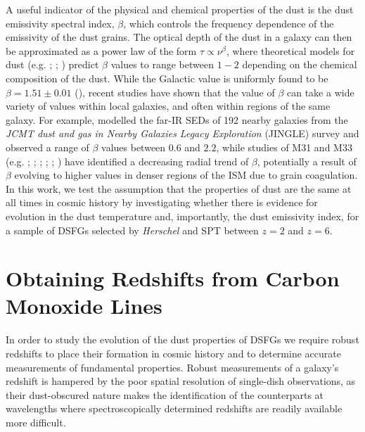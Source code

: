 A useful indicator of the physical and chemical properties of the dust is the dust emissivity spectral index, $\beta$, which controls the frequency dependence of the emissivity of the dust grains. The optical depth of the dust in a galaxy can then be approximated as a power law of the form $\tau \propto \nu^\beta$, where theoretical models for dust (e.g. \citealt{Draine_1984}; \citealt{Draine_2011}; \citealt{Kohler_2015}) predict $\beta$ values to range between $1 - 2$ depending on the chemical composition of the dust. While the Galactic value is uniformly found to be $\beta = 1.51\pm0.01$ (\citealt{Planck_Collaboration_2015}), recent studies have shown that the value of $\beta$ can take a wide variety of values within local galaxies, and often within regions of the same galaxy. For example, \citealt{Lamperti_2019} modelled the far-IR SEDs of 192 nearby galaxies from the \textit{JCMT dust and gas in Nearby Galaxies Legacy Exploration} (JINGLE) survey and observed a range of $\beta$ values between $0.6$ and $2.2$, while studies of M31 and M33 (e.g. \citealt{Smith_2012}; \citealt{Draine_2014}; \citealt{Tabatabaei_2014}; \citealt{Whitworth_2019}; \citealt{Athikkat-Eknath_2022}; \citealt{Clark_2023}) have identified a decreasing radial trend of $\beta$, potentially a result of $\beta$ evolving to higher values in denser regions of the ISM due to grain coagulation. In this work, we test the assumption that the properties of dust are the same at all times in cosmic history by investigating whether there is evidence for evolution in the dust temperature and, importantly, the dust emissivity index, for a sample of DSFGs selected by \textit{Herschel} and SPT between $z = 2$ and $z = 6$.

\section{Obtaining Redshifts from Carbon Monoxide Lines}

In order to study the evolution of the dust properties of DSFGs we require robust redshifts to place their formation in cosmic history and to determine accurate measurements of fundamental properties. Robust measurements of a galaxy's redshift is hampered by the poor spatial resolution of single-dish observations, as their dust-obscured nature makes the identification of the counterparts at wavelengths where spectroscopically determined redshifts are readily available more difficult.

